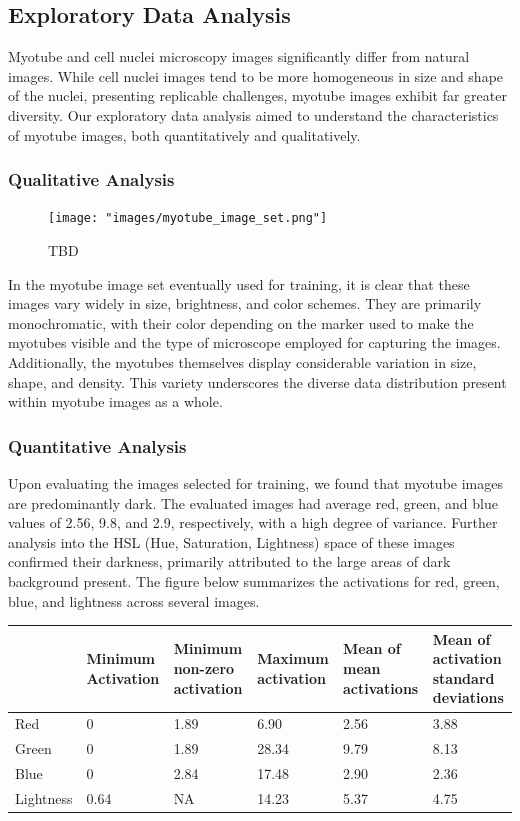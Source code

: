 \subsection{Exploratory Data Analysis}\label{secexploratory}
Myotube and cell nuclei microscopy images significantly differ from natural images. While cell nuclei images tend to be more homogeneous in size and shape of the nuclei, presenting replicable challenges, myotube images exhibit far greater diversity. Our exploratory data analysis aimed to understand the characteristics of myotube images, both quantitatively and qualitatively.

\subsubsection{Qualitative Analysis}
\begin{figure}
	\centering
	\texttt{[image: "images/myotube\_image\_set.png"]}
	\caption[TBD]{TBD}
	\label{fig1}
\end{figure}
In the myotube image set eventually used for training, it is clear that these images vary widely in size, brightness, and color schemes. They are primarily monochromatic, with their color depending on the marker used to make the myotubes visible and the type of microscope employed for capturing the images. Additionally, the myotubes themselves display considerable variation in size, shape, and density. This variety underscores the diverse data distribution present within myotube images as a whole.

\subsubsection{Quantitative Analysis}
Upon evaluating the images selected for training, we found that myotube images are predominantly dark. The evaluated images had average red, green, and blue values of 2.56, 9.8, and 2.9, respectively, with a high degree of variance. Further analysis into the HSL (Hue, Saturation, Lightness) space of these images confirmed their darkness, primarily attributed to the large areas of dark background present. The figure below summarizes the activations for red, green, blue, and lightness across several images.

\begin{tabular}{|p{2cm}|p{2cm}|p{2cm}|p{2cm}|p{2cm}|p{2cm}|}
	\hline
	& Minimum Activation & Minimum non-zero  activation & Maximum activation & Mean of mean activations & Mean of activation standard deviations \\
	\hline
	Red & 0 & 1.89 & 6.90 & 2.56 & 3.88 \\
	\hline
	Green & 0 & 1.89 & 28.34 & 9.79 & 8.13 \\
	\hline
	Blue & 0 & 2.84 & 17.48 & 2.90 & 2.36 \\
	\hline
	Lightness & 0.64 & NA & 14.23 & 5.37 & 4.75 \\
	\hline
\end{tabular}

